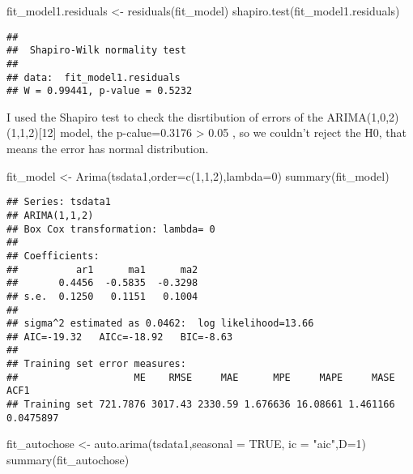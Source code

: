 \documentclass[
]{article}
\newenvironment{Shaded}{\begin{snugshade}}{\end{snugshade}}
\newcommand{\AttributeTok}[1]{\textcolor[rgb]{0.77,0.63,0.00}{#1}}
\newcommand{\ConstantTok}[1]{\textcolor[rgb]{0.00,0.00,0.00}{#1}}
\newcommand{\DecValTok}[1]{\textcolor[rgb]{0.00,0.00,0.81}{#1}}
\newcommand{\FunctionTok}[1]{\textcolor[rgb]{0.00,0.00,0.00}{#1}}
\newcommand{\NormalTok}[1]{#1}
\newcommand{\OtherTok}[1]{\textcolor[rgb]{0.56,0.35,0.01}{#1}}
\newcommand{\StringTok}[1]{\textcolor[rgb]{0.31,0.60,0.02}{#1}}
\begin{document}
\begin{Shaded}
\begin{Highlighting}[]
\NormalTok{fit\_model1.residuals }\OtherTok{\textless{}{-}} \FunctionTok{residuals}\NormalTok{(fit\_model)}
\FunctionTok{shapiro.test}\NormalTok{(fit\_model1.residuals)}
\end{Highlighting}
\end{Shaded}

\begin{verbatim}
## 
##  Shapiro-Wilk normality test
## 
## data:  fit_model1.residuals
## W = 0.99441, p-value = 0.5232
\end{verbatim}

I used the Shapiro test to check the disrtibution of errors of the
ARIMA(1,0,2)(1,1,2){[}12{]} model, the p-calue=0.3176 \textgreater{}
0.05 , so we couldn't reject the H0, that means the error has normal
distribution.

\begin{Shaded}
\begin{Highlighting}[]
\NormalTok{  fit\_model }\OtherTok{\textless{}{-}} \FunctionTok{Arima}\NormalTok{(tsdata1,}\AttributeTok{order=}\FunctionTok{c}\NormalTok{(}\DecValTok{1}\NormalTok{,}\DecValTok{1}\NormalTok{,}\DecValTok{2}\NormalTok{),}\AttributeTok{lambda=}\DecValTok{0}\NormalTok{)}
  \FunctionTok{summary}\NormalTok{(fit\_model)}
\end{Highlighting}
\end{Shaded}

\begin{verbatim}
## Series: tsdata1 
## ARIMA(1,1,2) 
## Box Cox transformation: lambda= 0 
## 
## Coefficients:
##          ar1      ma1      ma2
##       0.4456  -0.5835  -0.3298
## s.e.  0.1250   0.1151   0.1004
## 
## sigma^2 estimated as 0.0462:  log likelihood=13.66
## AIC=-19.32   AICc=-18.92   BIC=-8.63
## 
## Training set error measures:
##                    ME    RMSE     MAE      MPE     MAPE     MASE      ACF1
## Training set 721.7876 3017.43 2330.59 1.676636 16.08661 1.461166 0.0475897
\end{verbatim}

\begin{Shaded}
\begin{Highlighting}[]
\NormalTok{fit\_autochose }\OtherTok{\textless{}{-}} \FunctionTok{auto.arima}\NormalTok{(tsdata1,}\AttributeTok{seasonal =} \ConstantTok{TRUE}\NormalTok{, }\AttributeTok{ic =} \StringTok{"aic"}\NormalTok{,}\AttributeTok{D=}\DecValTok{1}\NormalTok{)}
\FunctionTok{summary}\NormalTok{(fit\_autochose)}
\end{Highlighting}
\end{Shaded}
\end{document}

